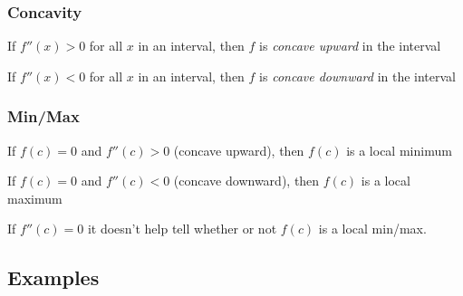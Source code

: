 \documentclass[letterpaper, landscape]{exam}
\begin{document}
  \subsubsection{Concavity} %
  
  \begin{itemize*}
    \item If $f''(x) > 0$ for all $x$ in an interval, then $f$ is {\em concave upward} in the
      interval
    \item If $f''(x) < 0$ for all $x$ in an interval, then $f$ is {\em concave downward} in the
      interval
  \end{itemize*}

  \subsubsection{Min/Max} %
  \begin{itemize*}
    \item If $f(c) = 0$ and $f''(c) > 0$ (concave upward), then $f(c)$ is a local minimum
    \item If $f(c) = 0$ and $f''(c) < 0$ (concave downward), then $f(c)$ is a local maximum
  \end{itemize*}

  If $f''(c) = 0$ it doesn't help tell whether or not $f(c)$ is a local min/max.
  
  \newpage

  \subsection{Examples} %
  
\end{document}
